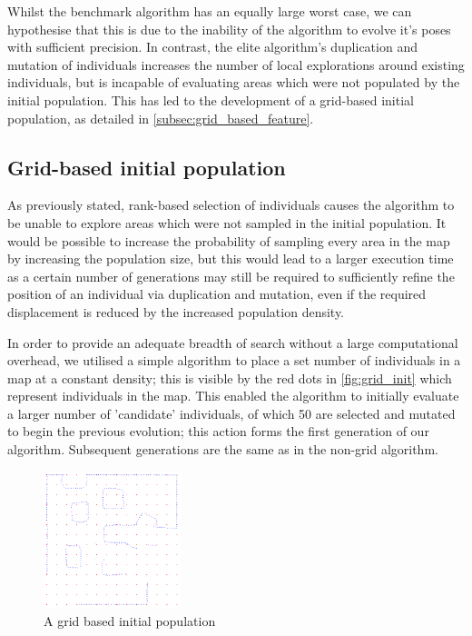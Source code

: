 \documentclass[authoryearcitations]{UoYCSproject}
\begin{document}
Whilst the benchmark algorithm has an equally large worst case, we can hypothesise that this is due to the inability of the algorithm to evolve it's poses with sufficient precision. In contrast, the elite algorithm's duplication and mutation of individuals increases the number of local explorations around existing individuals, but is incapable of evaluating areas which were not populated by the initial population. This has led to the development of a grid-based initial population, as detailed in \autoref{subsec:grid_based_feature}.

\subsection{Grid-based initial population}
\label{subsec:grid_based_feature}
 As previously stated, rank-based selection of individuals causes the algorithm to be unable to explore areas which were not sampled in the initial population. It would be possible to increase the probability of sampling every area in the map by increasing the population size, but this would lead to a larger execution time as a certain number of generations may still be required to sufficiently refine the position of an individual via duplication and mutation, even if the required displacement is reduced by the increased population density.

 In order to provide an adequate breadth of search without a large computational overhead, we utilised a simple algorithm to place a set number of individuals in a map at a constant density; this is visible by the red dots in \autoref{fig:grid_init} which represent individuals in the map. This enabled the algorithm to initially evaluate a larger number of 'candidate' individuals, of which 50 are selected and mutated to begin the previous evolution; this action forms the first generation of our algorithm. Subsequent generations are the same as in the non-grid algorithm. 

\begin{figure}
\centering
	\includegraphics[width=4cm,keepaspectratio]{images/grid.png}
	\caption{A grid based initial population}
	\label{fig:grid_init}
\end{figure}
\end{document}
